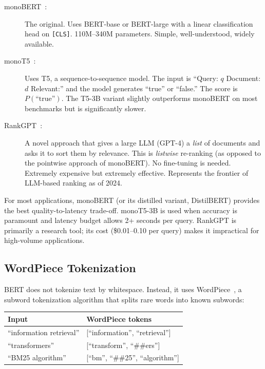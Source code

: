 \documentclass[11pt,a4paper]{article}
\theoremstyle{definition}
\theoremstyle{plain}
\begin{document}
\begin{description}
    \item[monoBERT~\cite{nogueira2019passage}:] The original. Uses BERT-base or BERT-large with a linear classification head on \texttt{[CLS]}. 110M--340M parameters. Simple, well-understood, widely available.
    
    \item[monoT5~\cite{nogueira2020document}:] Uses T5, a sequence-to-sequence model. The input is ``Query: $q$ Document: $d$ Relevant:'' and the model generates ``true'' or ``false.'' The score is $P(\text{``true''})$. The T5-3B variant slightly outperforms monoBERT on most benchmarks but is significantly slower.
    
    \item[RankGPT~\cite{sun2023chatgpt}:] A novel approach that gives a large LLM (GPT-4) a \emph{list} of documents and asks it to sort them by relevance. This is \emph{listwise} re-ranking (as opposed to the pointwise approach of monoBERT). No fine-tuning is needed. Extremely expensive but extremely effective. Represents the frontier of LLM-based ranking as of 2024.
\end{description}

\begin{production}
For most applications, monoBERT (or its distilled variant, DistilBERT) provides the best quality-to-latency trade-off. monoT5-3B is used when accuracy is paramount and latency budget allows 2+ seconds per query. RankGPT is primarily a research tool; its cost (\$0.01--0.10 per query) makes it impractical for high-volume applications.
\end{production}

\subsection{WordPiece Tokenization}

BERT does not tokenize text by whitespace. Instead, it uses WordPiece~\cite{wu2016google}, a subword tokenization algorithm that splits rare words into known subwords:

\begin{center}
\begin{tabular}{ll}
\toprule
\textbf{Input} & \textbf{WordPiece tokens} \\
\midrule
``information retrieval'' & [``information'', ``retrieval''] \\
``transformers'' & [``transform'', ``\#\#ers''] \\
``BM25 algorithm'' & [``bm'', ``\#\#25'', ``algorithm''] \\
\bottomrule
\end{tabular}
\end{center}
\end{document}
